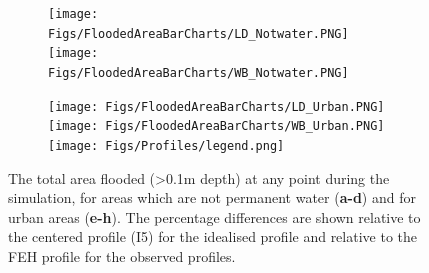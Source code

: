\documentclass[APA,Times2COL]{WileyNJDv5}
\begin{document}


\begin{figure}[h!]
    \begin{subfigure}[b]{\textwidth}
        \centering
        \texttt{[image: Figs/FloodedAreaBarCharts/LD\_Notwater.PNG]}
        \texttt{[image: Figs/FloodedAreaBarCharts/WB\_Notwater.PNG]}
    \end{subfigure}
    \begin{subfigure}[b]{\textwidth}
        \centering
        \texttt{[image: Figs/FloodedAreaBarCharts/LD\_Urban.PNG]}
        \texttt{[image: Figs/FloodedAreaBarCharts/WB\_Urban.PNG]}
        \centering
        \texttt{[image: Figs/Profiles/legend.png]}
    \end{subfigure}
\caption{The total area flooded (\textgreater 0.1m depth) at any point during the simulation, for areas which are not permanent water (\textbf{a-d}) and for urban areas (\textbf{e-h}). The percentage differences are shown relative to the centered profile (I5) for the idealised profile and relative to the FEH profile for the observed profiles.} \label{fig:total_flooded_area} 
\end{figure}
\end{document}
